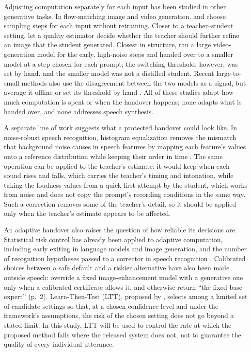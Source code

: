 Adjusting computation separately for each input has been studied in other generative tasks. In flow-matching image and video generation, \textcite{bajpai2026fastflow} and \textcite{bajpai2026coflow} choose sampling steps for each input without retraining. Closer to a teacher--student setting, \textcite{starodubcev2024your} let a quality estimator decide whether the teacher should further refine an image that the student generated. Closest in structure, \textcite{cheng2025srdiffusion} ran a large video-generation model for the early, high-noise steps and handed over to a smaller model at a step chosen for each prompt; the switching threshold, however, was set by hand, and the smaller model was not a distilled student. Recent large-to-small methods also use the disagreement between the two models as a signal, but average it offline or set its threshold by hand \parencite{munir2026track,sun2026hybridstitch}. All of these studies adapt how much computation is spent or when the handover happens; none adapts what is handed over, and none addresses speech synthesis.

A separate line of work suggests what a protected handover could look like. In noise-robust speech recognition, histogram equalization removes the mismatch that background noise causes in speech features by mapping each feature's values onto a reference distribution while keeping their order in time \parencite{delatorre2005histogram,dharanipragada2000nonlinear}. The same operation can be applied to the teacher's estimate: it would keep when each sound rises and falls, which carries the teacher's timing and intonation, while taking the loudness values from a quick first attempt by the student, which works from noise and does not copy the prompt's recording conditions in the same way. Such a correction removes some of the teacher's detail, so it should be applied only when the teacher's estimate appears to be affected.

An adaptive handover also raises the question of how reliable its decisions are. Statistical risk control has already been applied to adaptive computation, including early exiting in language models and image generation, and the number of recognition hypotheses passed to a corrector in speech recognition \parencite{damri2026confident,jazbec2024fast,schuster2022calm}. Calibrated choices between a safe default and a riskier alternative have also been made outside speech: \textcite{xie2026lowlight} override a fixed image-enhancement model with a generative one only when a calibrated certificate allows it, and otherwise return \enquote{the fixed base expert} (p.~2). Learn-Then-Test (LTT), proposed by \textcite{angelopoulos2025ltt}, selects among a limited set of candidate settings so that, at a chosen confidence level and under the framework's assumptions, the risk of the chosen setting does not go beyond a stated limit. In this study, LTT will be used to control the rate at which the proposed method fails where the released system does not, not to guarantee the quality of every individual utterance.

